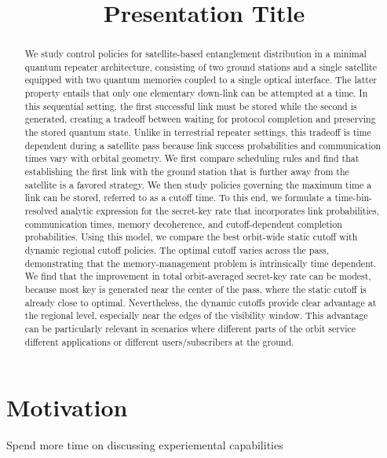 \documentclass[12pt]{article}
\title{Presentation Title}
\date{}
\begin{document}
\maketitle

\begin{abstract}
    We study control policies for satellite-based entanglement distribution in a minimal quantum repeater architecture, consisting of two ground stations and a single satellite equipped with two quantum memories coupled to a single optical interface. The latter property entails that only one elementary down-link can be attempted at a time. In this sequential setting, the first successful link must be stored while the second is generated, creating a tradeoff between waiting for protocol completion and preserving the stored quantum state. Unlike in terrestrial repeater settings, this tradeoff is time dependent during a satellite pass because link success probabilities and communication times vary with orbital geometry. We first compare scheduling rules and find that establishing the first link with the ground station that is further away from the satellite is a favored strategy. We then study policies governing the maximum time a link can be stored, referred to as a cutoff time. To this end, we formulate a time-bin-resolved analytic expression for the secret-key rate that incorporates link probabilities, communication times, memory decoherence, and cutoff-dependent completion probabilities. Using this model, we compare the best orbit-wide static cutoff with dynamic regional cutoff policies. The optimal cutoff varies across the pass, demonstrating that the memory-management problem is intrinsically time dependent. We find that the improvement in total orbit-averaged secret-key rate can be modest, because most key is generated near the center of the pass, where the static cutoff is already close to optimal. Nevertheless, the dynamic cutoffs provide clear advantage at the regional level, especially near the edges of the visibility window. This advantage can be particularly relevant in scenarios where different parts of the orbit service different applications or different users/subscribers at the ground.
\end{abstract}

\section{Motivation}

Spend more time on discussing experiemental capabilities
\end{document}
